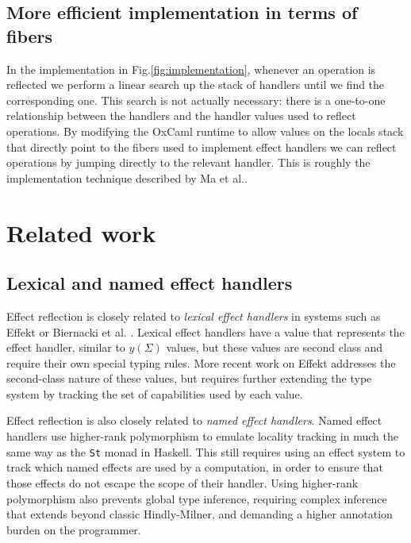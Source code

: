 \documentclass[acmsmall, screen, nonacm]{acmart}
\theoremstyle{definition}
\newcommand{\yoneda}[1]{y(#1)}
\begin{document}
\subsection{More efficient implementation in terms of fibers}

In the implementation in Fig.\ref{fig:implementation}, whenever an
operation is reflected we perform a linear search up the stack of
handlers until we find the corresponding one. This search is not
actually necessary: there is a one-to-one relationship between the
handlers and the handler values used to reflect operations. By modifying
the OxCaml runtime to allow values on the locals stack that directly
point to the fibers used to implement effect handlers we can reflect
operations by jumping directly to the relevant handler. This is roughly
the implementation technique described by Ma et al.\cite{ma2024lexical}.

\section{Related work}
\label{sec:related-work}

\subsection{Lexical and named effect handlers}

Effect reflection is closely related to \emph{lexical effect handlers}
in systems such as Effekt\cite{brachthauser2020effects} or Biernacki et
al. \cite{biernacki2019binders}. Lexical effect handlers have a value
that represents the effect handler, similar to $\yoneda{\Sigma}$ values,
but these values are second class and require their own special typing
rules. More recent work on Effekt\cite{brachthauser2022effects}
addresses the second-class nature of these values, but requires further
extending the type system by tracking the set of capabilities used by
each value.

Effect reflection is also closely related to \emph{named effect
  handlers}\cite{xie2022first}. Named effect handlers use higher-rank
polymorphism to emulate locality tracking in much the same way as the
\lstinline[style=haskell]{St} monad in Haskell. This still requires
using an effect system to track which named effects are used by a
computation, in order to ensure that those effects do not escape the
scope of their handler. Using higher-rank polymorphism also prevents
global type inference, requiring complex inference that extends beyond
classic Hindly-Milner, and demanding a higher annotation burden on the
programmer.
\end{document}
